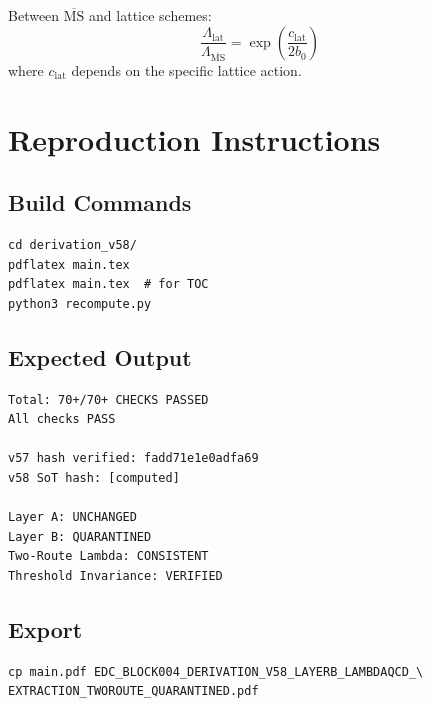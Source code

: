 \documentclass[11pt,a4paper]{article}
\theoremstyle{definition}
\begin{document}
Between $\overline{\text{MS}}$ and lattice schemes:
\begin{equation}
\label{eq:lambda-conversion}
\frac{\Lambda_{\text{lat}}}{\Lambda_{\overline{\text{MS}}}} = \exp\left(\frac{c_{\text{lat}}}{2b_0}\right)
\end{equation}
where $c_{\text{lat}}$ depends on the specific lattice action.

\section{Reproduction Instructions}
\label{app:reproduction}

\subsection{Build Commands}
\label{subsec:build-cmds}

\begin{verbatim}
cd derivation_v58/
pdflatex main.tex
pdflatex main.tex  # for TOC
python3 recompute.py
\end{verbatim}

\subsection{Expected Output}
\label{subsec:expected-output}

\begin{verbatim}
Total: 70+/70+ CHECKS PASSED
All checks PASS

v57 hash verified: fadd71e1e0adfa69
v58 SoT hash: [computed]

Layer A: UNCHANGED
Layer B: QUARANTINED
Two-Route Lambda: CONSISTENT
Threshold Invariance: VERIFIED
\end{verbatim}

\subsection{Export}
\label{subsec:export-cmd}

\begin{verbatim}
cp main.pdf EDC_BLOCK004_DERIVATION_V58_LAYERB_LAMBDAQCD_\
EXTRACTION_TWOROUTE_QUARANTINED.pdf
\end{verbatim}

\end{document}

